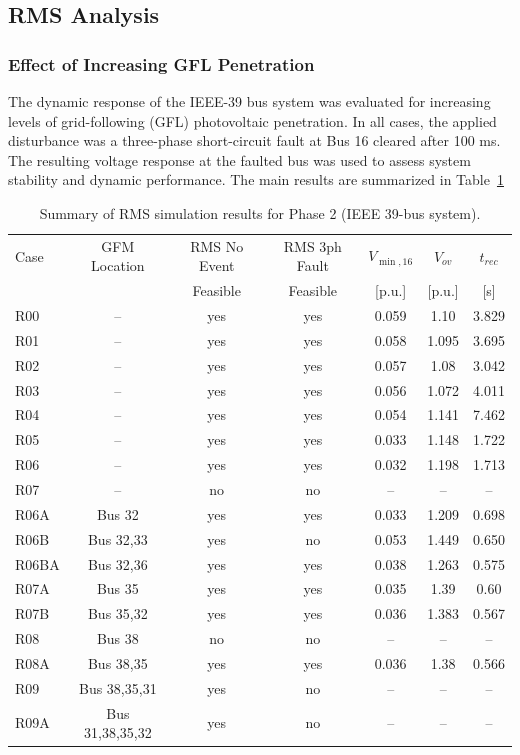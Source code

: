 \subsection{RMS Analysis}

\subsubsection{Effect of Increasing GFL Penetration}

The dynamic response of the IEEE-39 bus system was evaluated for increasing levels of grid-following (GFL) photovoltaic penetration. In all cases, the applied disturbance was a three-phase short-circuit fault at Bus 16 cleared after 100 ms. The resulting voltage response at the faulted bus was used to assess system stability and dynamic performance. The main results are summarized in Table~\ref{tab:rms_results}
\begin{table}[htbp]
\centering
\footnotesize
\caption{Summary of RMS simulation results for Phase 2 (IEEE 39-bus system).}
\label{tab:rms_results}
\begin{tabular}{l c c c c c c}
\toprule
Case & GFM Location & RMS No Event & RMS 3ph Fault & $V_{\min,16}$ & $V_{ov}$ & $t_{rec}$ \\
 &  & Feasible & Feasible & [p.u.] & [p.u.] & [s] \\
\midrule

R00 & -- & yes & yes & 0.059 & 1.10 & 3.829 \\
R01 & -- & yes & yes & 0.058 & 1.095 & 3.695 \\
R02 & -- & yes & yes & 0.057 & 1.08 & 3.042 \\
R03 & -- & yes & yes & 0.056 & 1.072 & 4.011 \\
R04 & -- & yes & yes & 0.054 & 1.141 & 7.462 \\
R05 & -- & yes & yes & 0.033 & 1.148 & 1.722 \\
R06 & -- & yes & yes & 0.032 & 1.198 & 1.713 \\
R07 & -- & no & no & -- & -- & -- \\
R06A & Bus 32 & yes & yes & 0.033 & 1.209 & 0.698 \\
R06B & Bus 32,33 & yes & no & 0.053 & 1.449 & 0.650 \\
R06BA & Bus 32,36 & yes & yes & 0.038 & 1.263 & 0.575 \\
R07A & Bus 35 & yes & yes & 0.035 & 1.39 & 0.60 \\
R07B & Bus 35,32 & yes & yes & 0.036 & 1.383 & 0.567 \\
R08 & Bus 38 & no & no & -- & -- & -- \\
R08A & Bus 38,35 & yes & yes & 0.036 & 1.38 & 0.566 \\
R09 & Bus 38,35,31 & yes & no & -- & -- & -- \\
R09A & Bus 31,38,35,32 & yes & no & -- & -- & -- \\

\bottomrule
\end{tabular}
\end{table}

